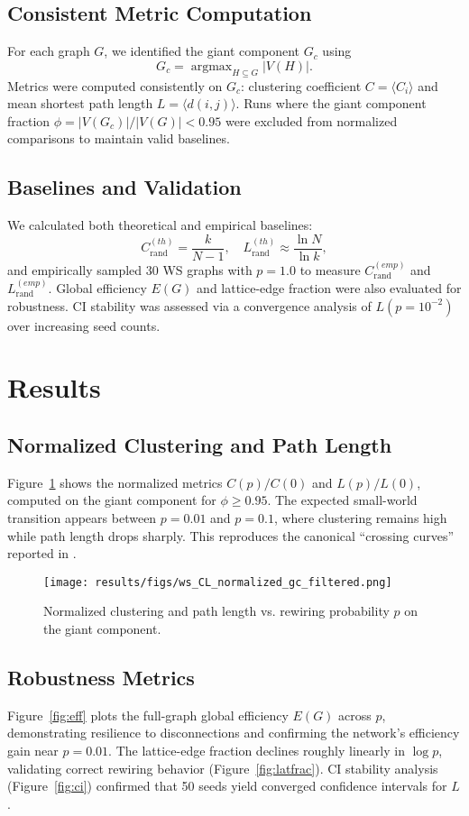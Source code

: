 \documentclass[11pt,a4paper]{article}
\begin{document}
\subsection{Consistent Metric Computation}
For each graph $G$, we identified the giant component $G_c$ using
\[
G_c = \operatorname{argmax}_{H \subseteq G} |V(H)|.
\]
Metrics were computed consistently on $G_c$: clustering coefficient $C = \langle C_i \rangle$ and mean shortest path length $L = \langle d(i,j) \rangle$. Runs where the giant component fraction $\phi = |V(G_c)| / |V(G)| < 0.95$ were excluded from normalized comparisons to maintain valid baselines.

\subsection{Baselines and Validation}
We calculated both theoretical and empirical baselines:
\[
C_{\text{rand}}^{(th)} = \frac{k}{N-1}, \quad
L_{\text{rand}}^{(th)} \approx \frac{\ln N}{\ln k},
\]
and empirically sampled 30 WS graphs with $p=1.0$ to measure $C_{\text{rand}}^{(emp)}$ and $L_{\text{rand}}^{(emp)}$. Global efficiency $E(G)$ and lattice-edge fraction were also evaluated for robustness. CI stability was assessed via a convergence analysis of $L(p=10^{-2})$ over increasing seed counts.

\section{Results}
\subsection{Normalized Clustering and Path Length}
Figure~\ref{fig:cl} shows the normalized metrics $C(p)/C(0)$ and $L(p)/L(0)$, computed on the giant component for $\phi \ge 0.95$. The expected small-world transition appears between $p=0.01$ and $p=0.1$, where clustering remains high while path length drops sharply. This reproduces the canonical ``crossing curves'' reported in \citet{watts1998collective}.

\begin{figure}[h!]
\centering
\texttt{[image: results/figs/ws\_CL\_normalized\_gc\_filtered.png]}
\caption{Normalized clustering and path length vs. rewiring probability $p$ on the giant component.}
\label{fig:cl}
\end{figure}

\subsection{Robustness Metrics}
Figure~\ref{fig:eff} plots the full-graph global efficiency $E(G)$ across $p$, demonstrating resilience to disconnections and confirming the network’s efficiency gain near $p=0.01$. The lattice-edge fraction declines roughly linearly in $\log p$, validating correct rewiring behavior (Figure~\ref{fig:latfrac}). CI stability analysis (Figure~\ref{fig:ci}) confirmed that 50 seeds yield converged confidence intervals for $L$.
\end{document}
